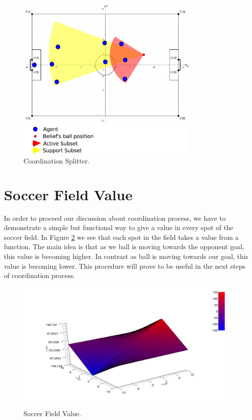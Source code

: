 \begin{figure}[t!]
\centering
  \includegraphics[width=0.8\textwidth]{Chapter4/figures/Splitter.pdf}
  \caption{Coordination Splitter.} 
  \label{fig:Splitter}
\end{figure}


\section{Soccer Field Value}
\label{FieldValue}

In order to proceed our discussion about coordination process, we have to demonstrate a simple but functional way to give a value in every spot of the soccer field. In Figure \ref{fig:SoccerValue} we see that each spot in the field takes a value from a function. The main idea is that as we ball is moving towards the opponent goal,  this value is becoming higher. In contrast as ball is moving towards our goal, this value is becoming lower. This procedure will prove to be useful in the next steps of coordination process.


\begin{figure}[t!]
\centering
  \includegraphics[width=\textwidth]{Chapter4/figures/Graph1.pdf}
  \caption{Soccer Field Value.} 
  \label{fig:SoccerValue}
\end{figure}


